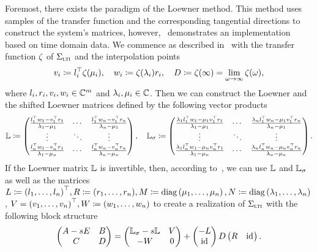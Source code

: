 Foremost, there exists the paradigm of the Loewner method.
This method uses samples of the transfer function and the corresponding tangential directions to construct the system's matrices, however,~\cite{Peherstorfer2017} demonstrates an implementation based on time domain data.
We commence as described in~\cite{BGD2020} with the transfer function $\zeta$ of $\Sigma_{\textnormal{\scshape lti}}$ and the interpolation points
\begin{equation*}
    v_i \coloneqq l_i^{\top} \zeta(\mu_i),\quad w_i \coloneqq \zeta(\lambda_i) r_i,\quad D\coloneqq \zeta(\infty) = \lim\limits_{\omega \to \infty} \zeta(\omega),
\end{equation*}
where $l_i, r_i, v_i, w_i \in \mathbb{C}^m$ and $\lambda_i, \mu_i \in \mathbb{C}$.
Then we can construct the Loewner and the shifted Loewner matrices defined by the following vector products
\begin{equation*}
    \mathbb{L} \coloneqq \begin{pmatrix}
        \frac{l_1^{\top} w_1  - v_1^{\top} r_1}{\lambda_1 - \mu_1} & \cdots & \frac{l_1^{\top} w_n  - v_1^{\top} r_n}{\lambda_n - \mu_1} \\
        \vdots & \ddots & \vdots \\
        \frac{l_n^{\top} w_1  - v_n^{\top} r_1}{\lambda_1 - \mu_n} & \cdots & \frac{l_n^{\top} w_n  - v_n^{\top} r_n}{\lambda_n - \mu_n}
    \end{pmatrix},\quad \mathbb{L}_\sigma \coloneqq \begin{pmatrix}
        \frac{\lambda_1 l_1^{\top} w_1 - \mu_1 v_1^{\top} r_1}{\lambda_1 - \mu_1} & \cdots & \frac{\lambda_n l_1^{\top} w_n - \mu_1 v_1^{\top} r_n}{\lambda_n - \mu_1} \\
        \vdots & \ddots & \vdots \\
        \frac{\lambda_1 l_n^{\top} w_1 - \mu_n v_n^{\top} r_1}{\lambda_1 - \mu_n} & \cdots & \frac{\lambda_n l_n^{\top} w_n - \mu_n v_n^{\top} r_n}{\lambda_n - \mu_n}
    \end{pmatrix}.
\end{equation*}
If the Loewner matrix $\mathbb{L}$ is invertible, then, according to~\cite[Theorem~5.1]{BGD2020}, we can use $\mathbb{L}$ and $\mathbb{L}_\sigma$ as well as the matrices $L \coloneqq {(l_1, \dots, l_n)}^{\top}, R \coloneqq (r_1, \dots, r_n), M \coloneqq \mathop{}\!\mathrm{diag}\left(\mu_1, \dots, \mu_n\right), N \coloneqq \mathop{}\!\mathrm{diag}\left(\lambda_1, \dots, \lambda_n\right)$, $V = {(v_1, \dots, v_n)}^{\top}, W \coloneqq (w_1, \dots, w_n)$ to create a realization of $\Sigma_{\textnormal{\scshape lti}}$ with the following block structure
\begin{equation*}
    \begin{pmatrix}
        A - sE & B \\
        C & D
    \end{pmatrix} = \begin{pmatrix}
        \mathbb{L}_\sigma - s \mathbb{L} & V \\
        -W & 0
    \end{pmatrix} + \begin{pmatrix}
        -L \\
        \text{id}_{}
    \end{pmatrix} D \begin{pmatrix}
        R & \text{id}_{}
    \end{pmatrix}.
\end{equation*}

